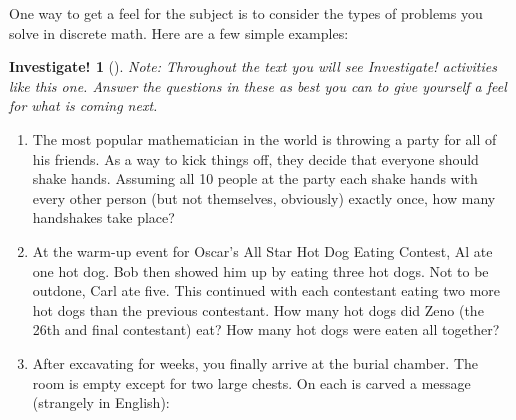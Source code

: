 \documentclass[10pt,]{book}
\theoremstyle{plain}
\theoremstyle{definition}
\theoremstyle{definition}
\newtheorem{investigation}[project]{Investigate!}
\numberwithin{equation}{chapter}
\begin{document}
\hypertarget{p-25}{}%
One way to get a feel for the subject is to consider the types of problems you solve in discrete math. Here are a few simple examples:%
\begin{investigation}[]\label{investigation-1}
\hypertarget{p-26}{}%
\emph{Note: Throughout the text you will see \emph{Investigate!} activities like this one. Answer the questions in these as best you can to give yourself a feel for what is coming next.}%
\par
\hypertarget{p-27}{}%
%
\begin{enumerate}
\item\hypertarget{li-5}{}\hypertarget{p-28}{}%
The most popular mathematician in the world is throwing a party for all of his friends. As a way to kick things off, they decide that everyone should shake hands. Assuming all 10 people at the party each shake hands with every other person (but not themselves, obviously) exactly once, how many handshakes take place?%
\item\hypertarget{li-6}{}\hypertarget{p-29}{}%
At the warm-up event for Oscar's All Star Hot Dog Eating Contest, Al ate one hot dog. Bob then showed him up by eating three hot dogs. Not to be outdone, Carl ate five. This continued with each contestant eating two more hot dogs than the previous contestant. How many hot dogs did Zeno (the 26th and final contestant) eat? How many hot dogs were eaten all together?%
\item\hypertarget{li-7}{}\hypertarget{p-30}{}%
After excavating for weeks, you finally arrive at the burial chamber. The room is empty except for two large chests. On each is carved a message (strangely in English):%
\begin{sidebyside}{1}{0.1}{0.1}{0}
\begin{sbspanel}{0.8}
\end{sbspanel}
\end{sidebyside}

\end{enumerate}
\end{investigation}
\end{document}

